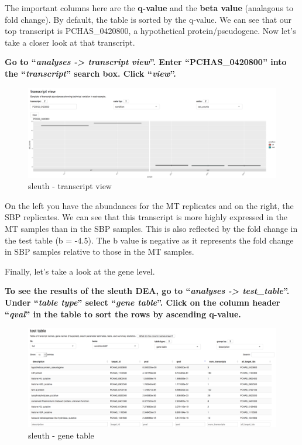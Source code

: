 \documentclass[11pt]{article}
\begin{document}
    The important columns here are the \textbf{q-value} and the \textbf{beta
value} (analagous to fold change). By default, the table is sorted by
the q-value. We can see that our top transcript is PCHAS\_0420800, a
hypothetical protein/pseudogene. Now let's take a closer look at that
transcript.

\newpage

\textbf{Go to ``\textit{analyses -\textgreater{} transcript view}''. Enter
``PCHAS\_0420800'' into the ``\textit{transcript}'' search box. Click
``\textit{view}''.}

    \begin{figure}[!h]
\centering
\includegraphics{images/sleuth-transcript-view.png}
\caption{sleuth - transcript view}
\end{figure}

    On the left you have the abundances for the MT replicates and on the
right, the SBP replicates. We can see that this transcript is more
highly expressed in the MT samples than in the SBP samples. This is also
reflected by the fold change in the test table (b = -4.5). The b value
is negative as it represents the fold change in SBP samples relative to
those in the MT samples.

Finally, let's take a look at the gene level.

\textbf{To see the results of the sleuth DEA, go to ``\textit{analyses
-\textgreater{} test\_table}''. Under ``\textit{table type}'' select
``\textit{gene table}''. Click on the column header ``\textit{qval}'' in the
table to sort the rows by ascending q-value.}

    \begin{figure}[!h]
\centering
\includegraphics{images/sleuth-gene-table.png}
\caption{sleuth - gene table}
\end{figure}
\end{document}
